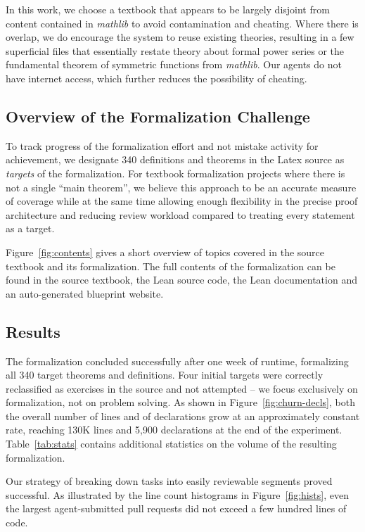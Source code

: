 \documentclass[]{fairmeta}
\begin{document}
In this work, we choose a textbook that appears to be largely disjoint from content contained in \emph{mathlib} to avoid contamination and cheating. Where there is overlap, we do encourage the system to reuse existing theories, resulting in a few superficial files that essentially restate theory about formal power series or the fundamental theorem of symmetric functions from \emph{mathlib}.
Our agents do not have internet access, which further reduces the possibility of cheating.

\subsection{Overview of the Formalization Challenge}
To track progress of the formalization effort and not mistake activity for achievement, we designate 340 definitions and theorems in the Latex source as \emph{targets} of the formalization. For textbook formalization projects where there is not a single ``main theorem'', we believe this approach to be an accurate measure of coverage while at the same time allowing enough flexibility in the precise proof architecture and reducing review workload compared to treating every statement as a target.



Figure~\ref{fig:contents} gives a short overview of topics covered in the source textbook and its formalization. The full contents of the formalization can be found in the source textbook, the Lean source code, the Lean documentation and an auto-generated blueprint website.

\subsection{Results}




The formalization concluded successfully after one week of runtime, formalizing all 340 target theorems and definitions.
Four initial targets were correctly reclassified as exercises in the source and not attempted -- we focus exclusively on formalization, not on problem solving.
As shown in Figure~\ref{fig:churn-decls}, both the overall number of lines and of declarations grow at an approximately constant rate, reaching 130K lines and 5,900 declarations at the end of the experiment. 
Table~\ref{tab:stats} contains additional statistics on the volume of the resulting formalization. 


Our strategy of breaking down tasks into easily reviewable segments proved successful. As illustrated by the line count histograms in Figure~\ref{fig:hists}, even the largest agent-submitted pull requests did not exceed a few hundred lines of code.
\end{document}
